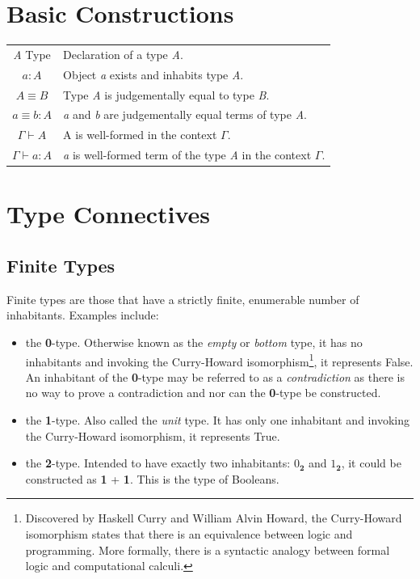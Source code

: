 \documentclass[12pt]{report}
\begin{document}
\section{Basic Constructions}
\begin{center}
\begin{tabular}{c l}
\textit{A} Type & Declaration of a type \textit{A}.\\
$a : A$ & Object \textit{a} exists and inhabits type \textit{A}. \\
$A \equiv B$ & Type \textit{A} is judgementally equal to type \textit{B}.\\
$ a \equiv b : A$ & \textit{a} and \textit{b} are judgementally equal terms of type \textit{A}.\\
$\Gamma \vdash A$ & A is well-formed in the context $\Gamma$.\\
$\Gamma \vdash a:A$ & \textit{a} is well-formed term of the type \textit{A} in the context $\Gamma$.
\end{tabular}
\end{center}


\section{Type Connectives}
\subsection{Finite Types}
Finite types are those that have a strictly finite, enumerable number of inhabitants. Examples include:
\begin{itemize}
\item the \textbf{0}-type. Otherwise known as the \textit{empty} or \textit{bottom} type, it has no inhabitants and invoking the Curry-Howard isomorphism\footnote{

Discovered by Haskell Curry and William Alvin Howard, the Curry-Howard isomorphism states that there is an equivalence between logic and programming. More formally, there is a syntactic analogy between formal logic and computational calculi.

}, it represents False. An inhabitant of the \textbf{0}-type may be referred to as a \textit{contradiction} as there is no way to prove a contradiction and nor can the \textbf{0}-type be constructed.
\item the \textbf{1}-type. Also called the \textit{unit} type. It has only one inhabitant and invoking the Curry-Howard isomorphism, it represents True. 
\item the \textbf{2}-type. Intended to have exactly two inhabitants: $0_\textbf{2}$ and $1_\textbf{2}$, it could be constructed as \textbf{1} + \textbf{1}. This is the type of Booleans.
\end{itemize}
\end{document}
